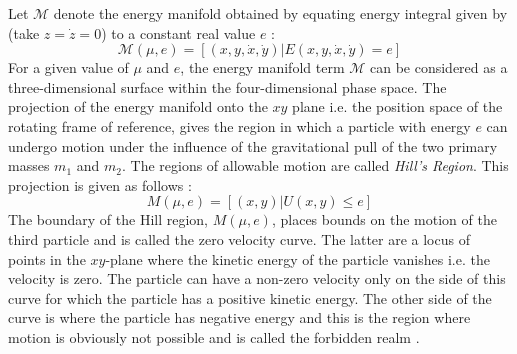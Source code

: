 Let $\mathcal{M}$ denote the energy manifold obtained by equating energy integral given by  (take $z=\dot{z}=0$) to a constant real value $e$ \cite{invariant}:
\begin{equation}
\label{energy_manifold}
\mathcal{M}(\mu, e) = [(x,y,\dot{x},\dot{y})| E(x,y,\dot{x}, \dot{y}) = e]
\end{equation}
%
For a given value of $\mu$ and $e$, the energy manifold term $\mathcal{M}$ can be considered as a three-dimensional surface within the four-dimensional phase space. The projection of the energy manifold onto the $xy$ plane i.e. the position space of the rotating frame of reference, gives the region in which a particle with energy $e$ can undergo motion under the influence of the gravitational pull of the two primary masses $m_1$ and $m_2$. The regions of allowable motion are called \textit{Hill's Region}. This projection is given as follows \cite{invariant}:
\begin{equation}
\label{Hill}
M(\mu, e) = [(x,y) | U(x,y) \leq e]
\end{equation}
%
The boundary of the Hill region, $M(\mu,e)$, places bounds on the motion of the third particle and is called the zero velocity curve. The latter are a locus of points in the $xy$-plane where the kinetic energy of the particle vanishes i.e. the velocity is zero. The particle can have a non-zero velocity only on the side of this curve for which the particle has a positive kinetic energy. The other side of the curve is where the particle has negative energy and this is the region where motion is obviously not possible and is called the forbidden realm \cite{invariant}.

